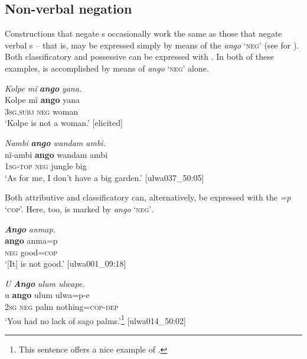 \subsection{Non-verbal negation}\label{sec:13.3.2}


Constructions that negate s occasionally work the same as those that negate verbal s -- that is,  may be expressed simply by means of the  \textit{ango} ‘\textsc{neg}’ (see  for ). Both  classificatory  and  possessive   can be expressed with . In both of these examples,  is accomplished by means of \textit{ango} ‘\textsc{neg}’ alone.

\ea%
    \label{ex:syntax:136}
          \textit{Kolpe mï} \textbf{\textit{ango}} \textit{yana.}\\
\gll    Kolpe  mï      \textbf{ango}  yana\\
    [name]  \textsc{3sg.subj}  \textsc{neg}  woman\\
\glt `Kolpe is not a woman.’ [elicited]
\z

\ea%
    \label{ex:syntax:137}
          \textit{Nambi} \textbf{\textit{ango}} \textit{wandam ambi.}\\
\gll    nï-ambi  \textbf{ango}  wandam  ambi\\
    1\textsc{sg-top}  \textsc{neg}  jungle    big\\
\glt `As for me, I don’t have a big garden.’ [ulwa037\_50:05]
\z

Both  attributive  and  classificatory   can, alternatively, be expressed with the  \textit{=p} ‘\textsc{cop}’. Here, too,  is marked by \textit{ango} ‘\textsc{neg’}.

\ea%
    \label{ex:syntax:138}
          \textbf{\textit{Ango}} \textit{anmap.}\\
\gll    \textbf{ango}  anma=p\\
    \textsc{neg}  good=\textsc{cop}\\
\glt `[It] is not good.’ [ulwa001\_09:18]
\z

\ea%
    \label{ex:syntax:139}
          \textit{U} \textbf{\textit{Ango}} \textit{ulum ulwape.}\\
\gll    u    \textbf{ango}  ulum  ulwa=p-e\\
    2\textsc{sg}  \textsc{neg}  palm  nothing=\textsc{cop-dep}\\
\glt `You had no lack of sago palms.’\footnote{This sentence offers a nice example of .} [ulwa014\_50:02]
\z

